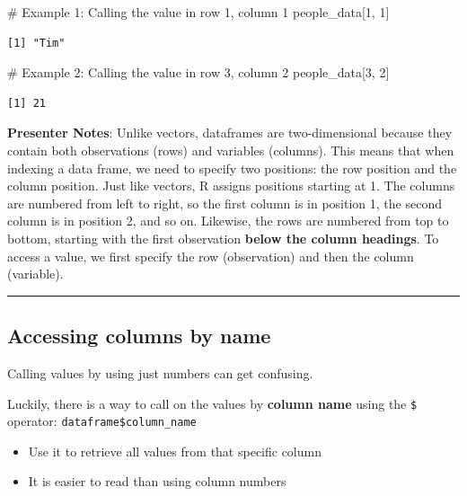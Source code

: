 \documentclass[
  letterpaper,
  DIV=11,
  numbers=noendperiod]{scrartcl}
\newenvironment{Shaded}{\begin{snugshade}}{\end{snugshade}}
\newcommand{\CommentTok}[1]{\textcolor[rgb]{0.37,0.37,0.37}{#1}}
\newcommand{\DecValTok}[1]{\textcolor[rgb]{0.68,0.00,0.00}{#1}}
\newcommand{\NormalTok}[1]{\textcolor[rgb]{0.00,0.23,0.31}{#1}}
\providecommand{\tightlist}{%
  \setlength{\itemsep}{0pt}\setlength{\parskip}{0pt}}
\begin{document}
\begin{Shaded}
\begin{Highlighting}[]
\CommentTok{\# Example 1: Calling the value in row 1, column 1}
\NormalTok{people\_data[}\DecValTok{1}\NormalTok{, }\DecValTok{1}\NormalTok{]}
\end{Highlighting}
\end{Shaded}

\begin{verbatim}
[1] "Tim"
\end{verbatim}

\begin{Shaded}
\begin{Highlighting}[]
\CommentTok{\# Example 2: Calling the value in row 3, column 2}
\NormalTok{people\_data[}\DecValTok{3}\NormalTok{, }\DecValTok{2}\NormalTok{]}
\end{Highlighting}
\end{Shaded}

\begin{verbatim}
[1] 21
\end{verbatim}

\textbf{Presenter Notes}: Unlike vectors, dataframes are two-dimensional
because they contain both observations (rows) and variables (columns).
This means that when indexing a data frame, we need to specify two
positions: the row position and the column position. Just like vectors,
R assigns positions starting at 1. The columns are numbered from left to
right, so the first column is in position 1, the second column is in
position 2, and so on. Likewise, the rows are numbered from top to
bottom, starting with the first observation \textbf{below the column
headings}. To access a value, we first specify the row (observation) and
then the column (variable).

\begin{center}\rule{0.5\linewidth}{0.5pt}\end{center}

\subsection{Accessing columns by name}\label{accessing-columns-by-name}

Calling values by using just numbers can get confusing.

Luckily, there is a way to call on the values by \textbf{column name}
using the \texttt{\$} operator: \texttt{dataframe\$column\_name}

\begin{itemize}
\tightlist
\item
  Use it to retrieve all values from that specific column
\item
  It is easier to read than using column numbers
\end{itemize}
\end{document}
